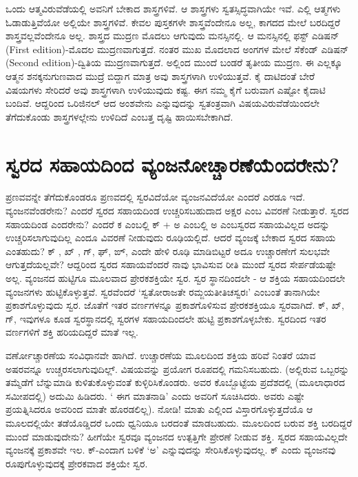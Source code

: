 ಒಂದು ಆತ್ಮವಿರುವೆಡೆಯಲ್ಲಿ ಅವನಿಗೆ ಬೇಕಾದ ಶಾಸ್ತ್ರಗಳಿವೆ. ಆ ಶಾಸ್ತ್ರಗಳು ಸ್ವತಸ್ಸಿದ್ಧವಾಗಿಯೇ ಇವೆ. ಎಲ್ಲಿ ಆತ್ಮಗಳು ಓಡಾಡುತ್ತಿವೆಯೋ ಅಲ್ಲಿಯೇ ಶಾಸ್ತ್ರಗಳಿವೆ. ಕೇವಲ ಪುಸ್ತಕಗಳೇ ಶಾಸ್ತ್ರವೆಂದೇನೂ ಅಲ್ಲ, ಕಾಗದದ ಮೇಲೆ ಬರದಿದ್ದರೆ ಶಾಸ್ತ್ರವಲ್ಲವೆಂದೇನೂ ಅಲ್ಲ. ಶಾಸ್ತ್ರದ ಮುದ್ರಣ ಮೊದಲು ಆಗುವುದು ಮನಸ್ಸಿನಲ್ಲಿ. ಆ ಮನಸ್ಸಿನಲ್ಲಿ ಫಸ್ಟ್  ಎಡಿಷನ್ {(\eng First edition)}-ಮೊದಲ ಮುದ್ರಣವಾಗುತ್ತದೆ. ನಂತರ ಮುಖ ಮೊದಲಾದ ಅಂಗಗಳ ಮೇಲೆ ಸೆಕೆಂಡ್ ಎಡಿಷನ್ {(\eng Second edition)}-ದ್ವಿತಿಯ ಮುದ್ರಣವಾಗುತ್ತದೆ. ಅಲ್ಲಿಂದ ಮುಂದೆ ಬಂಡರೆ ತೃತೀಯ ಮುದ್ರಣ. ಈ ಎಲ್ಲಕ್ಕೂ ಆತ್ಮನ ಶನಕ್ಕನುಗುಣವಾದ ಮುದ್ರೆ ಬಿದ್ದಾಗ ಮಾತ್ರ ಅವು ಶಾಸ್ತ್ರಗಳಾಗಿ ಉಳಿಯುತ್ತವೆ. ಕೈ ದಾಟಿದಂತೆ ಬೇರೆ ವಿಷಯಗಳು ಸೇರಿದರೆ ಅವು ಶಾಸ್ತ್ರಗಳಾಗಿ ಉಳಿಯುವುದು ಕಷ್ಟ. ಈಗ ನಮ್ಮ ಕೈಗೆ ಬರುವಾಗ ಎಷ್ಟೋ ಕೈದಾಟಿ ಬಂದಿವೆ. ಆದ್ದರಿಂದ ಒರಿಜಿನಲ್ ಆದ ಅಂಶವೇನು ಎನ್ನುವುದನ್ನು ಸ್ವತಂತ್ರವಾಗಿ ವಿಷಯವಿರುವೆಡೆಯಿಂದಲೇ ತೆಗೆದುಕೊಂಡು ಶಾಸ್ತ್ರಗಳಲ್ಲೇನು ಉಳಿದಿದೆ ಎಂಬತ್ತ ದೃಷ್ಟಿ ಹಾಯಿಸಬೇಕಾಗಿದೆ.

\section*{ಸ್ವರದ ಸಹಾಯದಿಂದ ವ್ಯಂಜನೋಚ್ಚಾರಣೆಯೆಂದರೇನು?}

ಪ್ರಣವವನ್ನೇ ತೆಗೆದುಕೊಂಡರೂ ಪ್ರಣವದಲ್ಲಿ ಸ್ವರವಿದೆಯೋ ವ್ಯಂಜನವಿದೆಯೋ ಎಂದರೆ ಎರಡೂ ಇದೆ. ವ್ಯಂಜನವೆಂಡರೇನು? ಎಂದರೆ ಸ್ವರದ ಸಹಾಯದಿಂಡ ಉಚ್ಚರಿಸಬಹುದಾದ ಅಕ್ಷರ ಎಂಬ ವಿವರಣೆ ನೀಡುತ್ತಾರೆ. ಸ್ವರದ ಸಹಾಯದಿಂಡ ಎಂದರೇನು? ಎಂದರೆ ಕ ಎಂಬಲ್ಲಿ ಕ್ + ಅ ಎಂಬಲ್ಲಿ ಅ ಎಂಬಸ್ವರದ ಸಹಾಯವಿಲ್ಲದ ಅದನ್ನು ಉಚ್ಚರಿಸಲಾಗುವುದಿಲ್ಲ ಎಂದೂ ವಿವರಣೆ ನೀಡುವುದು ರೂಢಿಯಲ್ಲಿದೆ. ಆದರೆ ವ್ಯಂಜಕ್ಕೆ  ಬೇಕಾದ ಸ್ವರದ ಸಹಾಯ ಎಂತಹುದು? ಕ್ , ಖ್ , ಗ್, ಘ್, ಙ್, ಎಂದೇ ಹೇಳಿ ರೂಢಿ ಮಾಡಿಬಿಟ್ಟರೆ ಅದೂ ಉಚ್ಚಾರಣೇಗೆ ಸುಲಭವೇ ಆಗುತ್ತದೆಯಲ್ಲವೇ? ಆದ್ದರಿಂದ ಸ್ವರದ ಸಹಾಯವೆಂದರೆ ನಾವು ಭಾವಿಸುವ ರೀತಿ ಮುಂದೆ ಸ್ವರದ ಸೇರ್ಪಡೆಯಷ್ಟೇ ಅಲ್ಲ. ವ್ಯಂಜನದ ಹುಟ್ಟಿಗೂ ಮೂಲವಾದ ಪ್ರೇರಕಶಕ್ತಿಯೇ ಸ್ವರ. ಸ್ವರ ಸ್ಥಾನದಿಂದಲೇ - ಆ ಶಕ್ತಿಯ ಸಹಾಯದಿಂದಲೇ ವ್ಯಂಜನಗಳು ಹುಟ್ಟಿಕೊಳ್ಳುತ್ತವೆ. ಸ್ವರವೆಂದರೆ `ಸ್ವತೋರಾಜತೇ ರಮ್ಜಯತೀತಿಚಸ್ವರಃ' ಎಂಬಂತೆ ತಾನಾಗಿಯೇ ಪ್ರಕಾಶಗೊಳ್ಳುವುದು ಸ್ವರ. ಜೊತೆಗೆ ಇತರ ವರ್ಣಗಳನ್ನೂ ಪ್ರಕಾಶಗೊಳಿಸುವ ಪ್ರೇರಕಶಕ್ತಿಯೂ ಸ್ವರವಾಗಿದೆ. ಕ್, ಖ್, ಗ್, ಇವುಗಳೂ ಕೂಡ ಸ್ವರಸ್ಥಾನದಲ್ಲಿ ಸ್ವರಗಳ ಸಹಾಯದಿಂದಲೇ ಹುಟ್ಟಿ ಪ್ರಕಾಶಗೊಳ್ಳಬೇಕು. ಸ್ವರದಿಂದ ಇತರ ವರ್ಣಗಳಿಗೆ ಶಕ್ತಿ ಹರಿಯದಿದ್ದರೆ ಮಾತೆ ಇಲ್ಲ.

ವರ್ಣೋಚ್ಚಾರಣೆಯ ಸಂವಿಧಾನವೇ ಹಾಗಿದೆ.  ಉಚ್ಚಾರಣೆಯ ಮೂಲದಿಂದ ಶಕ್ತಿಯ ಹರಿವೆ ನಿಂತರೆ ಯಾವ ಅಷರವನ್ನೂ ಉಚ್ಚರಸಲಾಗುವುದಿಲ್ಲ್. ವಿಷಯವನ್ನು ಪ್ರಯೋಗ ರೂಪದಲ್ಲಿ ಗಮನಿಸಬಹುದು. (ಅಲ್ಲಿರುವ ಒಬ್ಬರನ್ನು ತಮ್ಮೆಡೆಗೆ ಬೆನ್ನುಮಾಡಿ ಕುಳಿತುಕೊಳ್ಳುವಂತೆ ಕುಳ್ಳಿರಿಸಿಕೊಂಡರು. ಅವರ ಕೊಬ್ಬೊಟ್ಟೆಯ ಪ್ರದೆಶದಲ್ಲಿ (ಮೂಲಾಧಾರದ ಸಮೀಪದಲ್ಲಿ) ಅದುಮಿ ಹಿಡಿದರು. ` ಈಗ ಮಾತನಾಡಿ' ಎಂದು ಅವರಿಗೆ ಸೂಚಿಸಿದರು. ಅವರು ಎಷ್ಟೇ ಪ್ರಯತ್ನಿಸಿದರೂ ಅವರಿಂದ ಮಾತೇ ಹೊರಡಲಿಲ್ಲ).  ನೋಡಿ! ಮಾತು ಎಲ್ಲಿಂದ ವಿಸ್ತಾರಗೊಳ್ಳುತ್ತದೆಯೊ ಆ ಮೂಲದಲ್ಲಿಯೇ ತಡೆಯೊಡ್ಡಿದರೆ ಒಂದು ಧ್ವನಿಯೂ ಬರದಂತೆ ಮಾಡಬಹುದು. ಮೂಲದಿಂದ ಬರುವ ಶಕ್ತಿ ಬರದಿದ್ದರೆ ಮುಂದೆ ಮಾಡುವುದೇನು? ಹೀಗೆಯೇ ಸ್ವರವೂ ವ್ಯಂಜನದ ಉತ್ಪತ್ತಿಗೇ ಪ್ರೇರಣೆ ನೀಡುವ ಶಕ್ತಿ. ಸ್ವರದ ಸಹಾಯವಿಲ್ಲದೇ ವ್ಯಂಜನಕ್ಕೆ  ಪ್ರಕಾಶವೇ ಇಲ. ಕ್-ಎಂದಾಗ ಬಳಿಕೆ `ಅ' ಎನ್ನುವುದನ್ನು ಸೇರಿಸಿಕೊಳ್ಳುವುದಲ್ಲ. ಕ್ ಎಂದು ವ್ಯಂಜನವು ರೂಪುಗೊಳ್ಳುವುದಕ್ಕೆ  ಪ್ರೇರಕವಾದ ಶಕ್ತಿಯೇ ಸ್ವರ.

